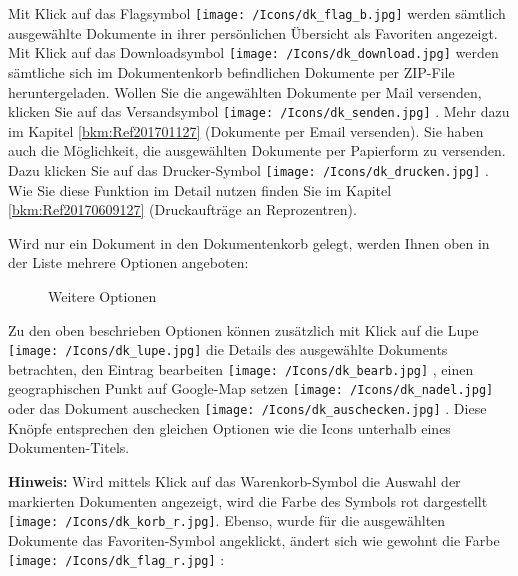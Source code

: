 Mit Klick auf das Flagsymbol \texttt{[image: /Icons/dk\_flag\_b.jpg]}  werden sämtlich ausgewählte Dokumente in ihrer persönlichen Übersicht als Favoriten angezeigt. \\
Mit Klick auf das Downloadsymbol \texttt{[image: /Icons/dk\_download.jpg]}  werden sämtliche sich im Dokumentenkorb befindlichen Dokumente per ZIP-File heruntergeladen. Wollen Sie die angewählten Dokumente per Mail versenden, klicken Sie auf das Versandsymbol \texttt{[image: /Icons/dk\_senden.jpg]} . Mehr dazu im Kapitel \ref{bkm:Ref201701127} (Dokumente per Email versenden). Sie haben auch die Möglichkeit, die ausgewählten Dokumente per Papierform zu versenden. Dazu klicken Sie auf das Drucker-Symbol \texttt{[image: /Icons/dk\_drucken.jpg]} . Wie Sie diese Funktion im Detail nutzen finden Sie im Kapitel \ref{bkm:Ref20170609127} (Druckaufträge an Reprozentren).

\vspace{\baselineskip}

Wird nur ein Dokument in den Dokumentenkorb gelegt, werden Ihnen oben in der Liste mehrere Optionen angeboten:

\begin{figure}[H]
\caption{Weitere Optionen}
\end{figure}

Zu den oben beschrieben Optionen können zusätzlich mit Klick auf die Lupe \texttt{[image: /Icons/dk\_lupe.jpg]}  die Details des ausgewählte Dokuments betrachten, den Eintrag bearbeiten \texttt{[image: /Icons/dk\_bearb.jpg]} , einen geographischen Punkt auf Google-Map setzen \texttt{[image: /Icons/dk\_nadel.jpg]}  oder das Dokument auschecken \texttt{[image: /Icons/dk\_auschecken.jpg]} . Diese Knöpfe entsprechen den gleichen Optionen wie die Icons unterhalb eines Dokumenten-Titels.

\vspace{\baselineskip}

\textbf{Hinweis:} Wird mittels Klick auf das Warenkorb-Symbol die Auswahl der markierten Dokumenten angezeigt, wird die Farbe des Symbols rot dargestellt \texttt{[image: /Icons/dk\_korb\_r.jpg]}. Ebenso, wurde für die ausgewählten Dokumente das Favoriten-Symbol angeklickt, ändert sich wie gewohnt die Farbe \texttt{[image: /Icons/dk\_flag\_r.jpg]} :

